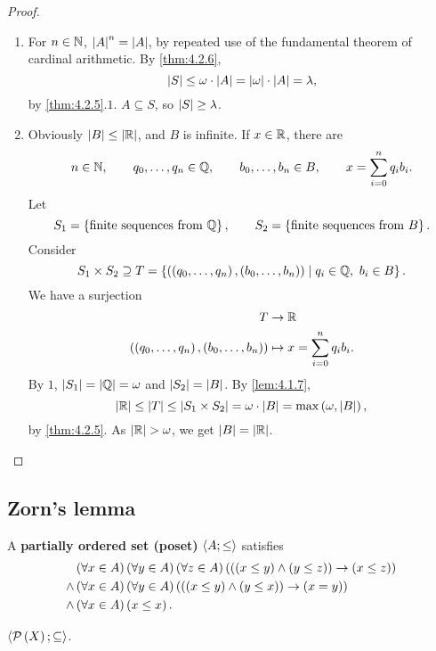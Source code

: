 \begin{proof}
\hfill
\begin{enumerate}
\item For $ n \in \N $, $ \abs{A}^n = \abs{A} $, by repeated use of the fundamental theorem of cardinal arithmetic. By \ref{thm:4.2.6},
$$ \abs{S} \le \omega \cdot \abs{A} = \abs{\omega} \cdot \abs{A} = \lambda, $$
by \ref{thm:4.2.5}.$ 1 $. $ A \subseteq S $, so $ \abs{S} \ge \lambda $.
\item Obviously $ \abs{B} \le \abs{\R} $, and $ B $ is infinite. If $ x \in \R $, there are
$$ n \in \N, \qquad q_0, \dots, q_n \in \Q, \qquad b_0, \dots, b_n \in B, \qquad x = \sum_{i = 0}^n q_ib_i. $$
Let
$$ S_1 = \cb{\text{finite sequences from} \ \Q}, \qquad S_2 = \cb{\text{finite sequences from} \ B}. $$
Consider
$$ S_1 \times S_2 \supseteq T = \cb{\rb{\rb{q_0, \dots, q_n}, \rb{b_0, \dots, b_n}} \mid q_i \in \Q, \ b_i \in B}. $$
We have a surjection
\begin{align*}
T & \to \R \\
\rb{\rb{q_0, \dots, q_n}, \rb{b_0, \dots, b_n}} & \mapsto x = \sum_{i = 0}^n q_ib_i.
\end{align*}
By $ 1 $, $ \abs{S_1} = \abs{\Q} = \omega $ and $ \abs{S_2} = \abs{B} $. By \ref{lem:4.1.7},
$$ \abs{\R} \le \abs{T} \le \abs{S_1 \times S_2} = \omega \cdot \abs{B} = \max\rb{\omega, \abs{B}}, $$
by \ref{thm:4.2.5}. As $ \abs{\R} > \omega $, we get $ \abs{B} = \abs{\R} $.
\end{enumerate}
\end{proof}

\pagebreak


\subsection{Zorn's lemma}

A \textbf{partially ordered set (poset)} $ \ab{A; \le} $ satisfies
\begin{align*}
& \fab{x \in A}\fab{y \in A}\fab{z \in A}\impb{\andb{\leb{x}{y}}{\leb{y}{z}}}{\leb{x}{z}} \\
\land & \fab{x \in A}\fab{y \in A}\impb{\andb{\leb{x}{y}}{\leb{y}{x}}}{\eqb{x}{y}} \\
\land & \fab{x \in A}\leb{x}{x}.
\end{align*}

\begin{example2}
$ \ab{\mathcal{P}\rb{X}; \subseteq} $.
\end{example2}

